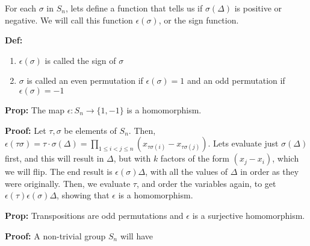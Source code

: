 \documentclass{article}
\begin{document}
For each $\sigma$ in $S_n$, lets define a function that tells us if $\sigma(\Delta)$ is positive or negative. We will call this function $\epsilon(\sigma)$, or the sign function.

\textbf{Def:} 
\begin{enumerate}
    \item $\epsilon(\sigma)$ is called the sign of $\sigma$
    \item $\sigma$ is called an even permutation if $\epsilon(\sigma) = 1$ and an odd permutation if $\epsilon(\sigma) = -1$
\end{enumerate}

\textbf{Prop:} The map $\epsilon: S_n \rightarrow \{1,-1\}$ is a homomorphism. 

\textbf{Proof:} Let $\tau, \sigma$ be elements of $S_n$. Then, $\epsilon(\tau\sigma) = \tau \cdot \sigma (\Delta) = \prod_{1\leq i < j \leq n} (x_{\tau\sigma(i)} - x_{\tau\sigma(j)})$. Lets evaluate just $\sigma(\Delta)$ first, and this will result in $\Delta$, but with $k$ factors of the form $(x_j - x_i)$, which we will flip. The end result is $\epsilon(\sigma) \Delta$, with all the values of $\Delta$ in order as they were originally. Then, we evaluate $\tau$, and order the variables again, to get $\epsilon(\tau)\epsilon(\sigma) \Delta$, showing that $\epsilon$ is a homomorphism. 

\textbf{Prop:} Transpositions are odd permutations and $\epsilon$ is a surjective homomorphism.

\textbf{Proof:} A non-trivial group $S_n$ will have
\end{document}

